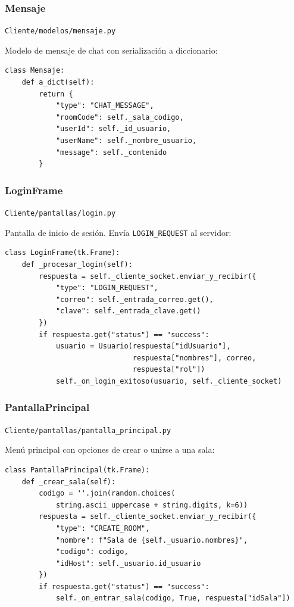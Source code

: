 \documentclass[12pt,a4paper]{article}
\begin{document}
\subsubsection{Mensaje}
\texttt{Cliente/modelos/mensaje.py}

Modelo de mensaje de chat con serializaci\'on a diccionario:

\begin{lstlisting}
class Mensaje:
    def a_dict(self):
        return {
            "type": "CHAT_MESSAGE",
            "roomCode": self._sala_codigo,
            "userId": self._id_usuario,
            "userName": self._nombre_usuario,
            "message": self._contenido
        }
\end{lstlisting}

\subsubsection{LoginFrame}
\texttt{Cliente/pantallas/login.py}

Pantalla de inicio de sesi\'on. Env\'ia \texttt{LOGIN\_REQUEST} al servidor:

\begin{lstlisting}
class LoginFrame(tk.Frame):
    def _procesar_login(self):
        respuesta = self._cliente_socket.enviar_y_recibir({
            "type": "LOGIN_REQUEST",
            "correo": self._entrada_correo.get(),
            "clave": self._entrada_clave.get()
        })
        if respuesta.get("status") == "success":
            usuario = Usuario(respuesta["idUsuario"],
                              respuesta["nombres"], correo,
                              respuesta["rol"])
            self._on_login_exitoso(usuario, self._cliente_socket)
\end{lstlisting}

\subsubsection{PantallaPrincipal}
\texttt{Cliente/pantallas/pantalla\_principal.py}

Men\'u principal con opciones de crear o unirse a una sala:

\begin{lstlisting}
class PantallaPrincipal(tk.Frame):
    def _crear_sala(self):
        codigo = ''.join(random.choices(
            string.ascii_uppercase + string.digits, k=6))
        respuesta = self._cliente_socket.enviar_y_recibir({
            "type": "CREATE_ROOM",
            "nombre": f"Sala de {self._usuario.nombres}",
            "codigo": codigo,
            "idHost": self._usuario.id_usuario
        })
        if respuesta.get("status") == "success":
            self._on_entrar_sala(codigo, True, respuesta["idSala"])
\end{lstlisting}
\end{document}
